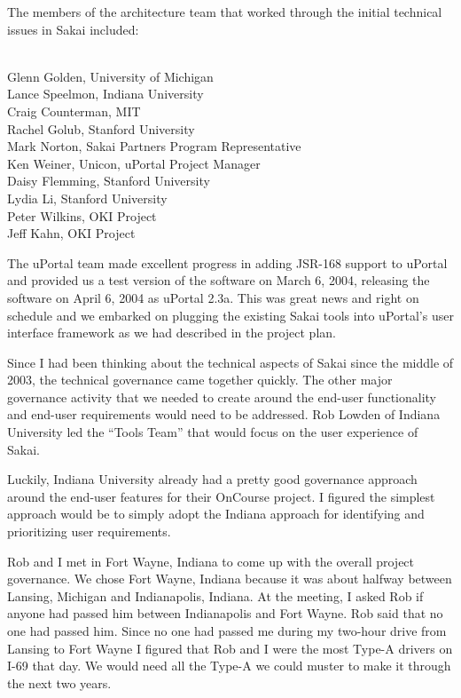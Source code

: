 \documentclass[12pt]{book}
\begin{document}
The members of the architecture team that worked through the initial technical
issues in Sakai included:\\
\\
\begin{sf}
Glenn Golden, University of Michigan\\
Lance Speelmon, Indiana University\\
Craig Counterman, MIT\\
Rachel Golub, Stanford University\\
Mark Norton, Sakai Partners Program Representative\\
Ken Weiner, Unicon, uPortal Project Manager\\
Daisy Flemming, Stanford University\\
Lydia Li, Stanford University\\
Peter Wilkins, OKI Project\\
Jeff Kahn, OKI Project\\
\end{sf}

The uPortal team made excellent progress in adding JSR-168 support to
uPortal and provided us a test version of the software on March 6, 2004,
releasing the software on April 6, 2004 as uPortal 2.3a.  This was
great news and right on schedule and we embarked on plugging the
existing Sakai tools into uPortal's user interface framework as we
had described in the project plan.

Since I had been thinking about the technical aspects of Sakai since the middle
of 2003, the technical governance came together quickly.   The other major
governance activity that we needed to create around the end-user functionality
and end-user requirements would need to be addressed.  Rob Lowden
of Indiana University led the ``Tools Team'' that would focus on the user experience
of Sakai.

Luckily, Indiana University already had a pretty good governance approach around the
end-user features for their OnCourse project.   I figured the simplest approach would
be to simply adopt the Indiana approach for identifying and prioritizing user
requirements.

Rob and I met in Fort Wayne, Indiana to come up with the overall
project governance.  We chose Fort Wayne, Indiana because
it was about halfway between Lansing, Michigan and Indianapolis, Indiana.  At
the meeting, I asked Rob if anyone had passed him between Indianapolis and Fort Wayne.
Rob said that no one had passed him.   Since no one had passed me during my two-hour drive
from Lansing to Fort Wayne I figured that Rob and I were the most Type-A drivers on I-69
that day.  We would need all the Type-A we could muster to make it through the next two
years.
\end{document}
